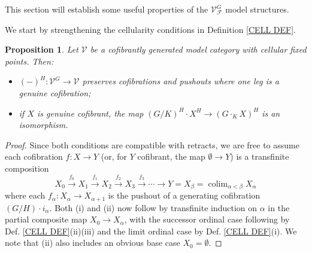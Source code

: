 \documentclass[a4paper,10pt
,draft
]{article}%
\numberwithin{equation}{section}
\numberwithin{figure}{section}
\newtheorem{proposition}[equation]{Proposition}%
\theoremstyle{definition} %
\DeclareMathOperator{\colim}{colim}%
\newcommand{\1}{\ensuremath{\mathbbm 1}}%
\begin{document}
This section will establish some useful properties of the $\mathcal{V}^G_{\mathcal{F}}$ model structures.

We start by strengthening the 
cellularity conditions in Definition \ref{CELL DEF}.

\begin{proposition}\label{STRONGCELL PROP}
	Let $\mathcal{V}$ be a cofibrantly generated model category with cellular fixed points. Then:
	\begin{itemize}
		\item[(i)] $(\minus)^H \colon \mathcal{V}^G \to \mathcal{V}$ preserves cofibrations and pushouts where one leg
			 is a genuine cofibration;
		\item[(ii)] if $X$ is genuine cofibrant, the map 
			$(G/K)^H \cdot X^H \to (G \cdot_K X)^H$ is an isomorphism.
	\end{itemize}
\end{proposition}


\begin{proof}
Since both conditions are compatible with retracts, 
we are free to assume each cofibration $f\colon X \to Y$
(or, for $Y$ cofibrant, the map $\emptyset \to Y$)
is a transfinite composition
\begin{equation}\label{TRANSFCOMP EQ}
	X_0 \xrightarrow{f_0} 
	X_1 \xrightarrow{f_1}
	X_2 \xrightarrow{f_2}
	X_3 \xrightarrow{f_3} 
	\cdots
	\to Y = X_{\beta} = \colim_{\alpha < \beta} X_{\alpha}
\end{equation}
where each $f_{\alpha} \colon X_{\alpha} \to X_{\alpha+1}$
is the pushout of a generating cofibration
$(G/H) \cdot i_{\alpha}$. Both (i) and (ii) now follow by transfinite induction on $\alpha$ in the partial composite map
$X_0 \to X_{\alpha}$, with the successor ordinal case following by Def. \ref{CELL DEF}(ii)(iii) and the limit ordinal case by
Def. \ref{CELL DEF}(i). We note that (ii) also includes an obvious base case $X_0=\emptyset$.
\end{proof}
\end{document}
